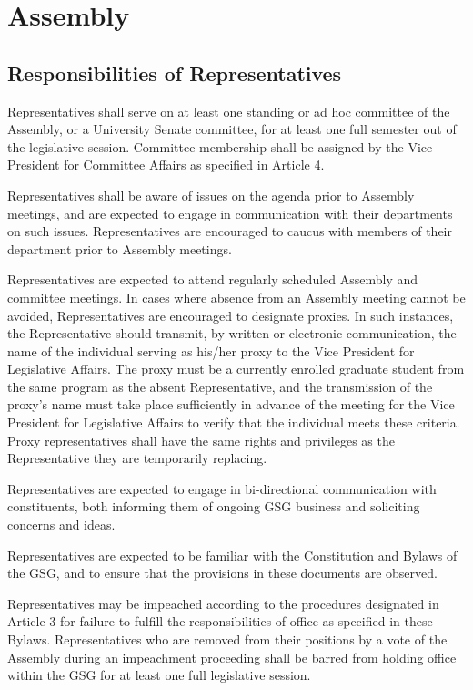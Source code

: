 \chapter{Assembly}
\section{Responsibilities of Representatives}
\begin{bylaws-number}
  \item Representatives shall serve on at least one standing or ad hoc committee of the Assembly, or a University Senate committee, for at least one full semester out of the legislative session. Committee membership shall be assigned by the Vice President for Committee Affairs as specified in Article 4.
  \item Representatives shall be aware of issues on the agenda prior to Assembly meetings, and are expected to engage in communication with their departments on such issues. Representatives are encouraged to caucus with members of their department prior to Assembly meetings.
  \item Representatives are expected to attend regularly scheduled Assembly and committee meetings. In cases where absence from an Assembly meeting cannot be avoided, Representatives are encouraged to designate proxies. In such instances, the Representative should transmit, by written or electronic communication, the name of the individual serving as his/her proxy to the Vice President for Legislative Affairs. The proxy must be a currently enrolled graduate student from the same program as the absent Representative, and the transmission of the proxy’s name must take place sufficiently in advance of the meeting for the Vice President for Legislative Affairs to verify that the individual meets these criteria. Proxy representatives shall have the same rights and privileges as the Representative they are temporarily replacing.
  \item Representatives are expected to engage in bi-directional communication with constituents, both informing them of ongoing GSG business and soliciting concerns and ideas.
  \item Representatives are expected to be familiar with the Constitution and Bylaws of the GSG, and to ensure that the provisions in these documents are observed.
  \item Representatives may be impeached according to the procedures designated in Article 3 for failure to fulfill the responsibilities of office as specified in these Bylaws. Representatives who are removed from their positions by a vote of the Assembly during an impeachment proceeding shall be barred from holding office within the GSG for at least one full legislative session.

\end{bylaws-number}
